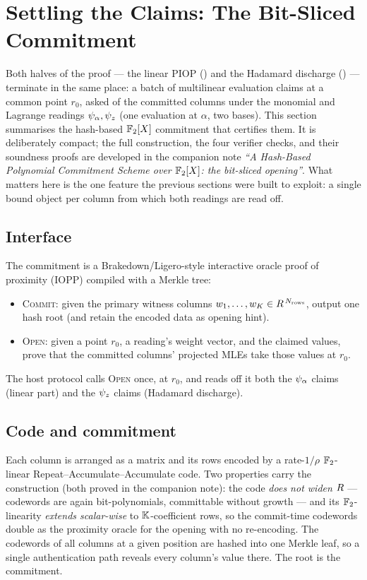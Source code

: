 \section{Settling the Claims: The Bit-Sliced Commitment}
\label{sec:commitment}

Both halves of the proof --- the linear PIOP () and the Hadamard
discharge () --- terminate in the same place: a batch of
multilinear evaluation claims at a common point $r_0$, asked of the committed
columns under the monomial and Lagrange readings $\psi_{\alpha},\psi_{z}$ (one evaluation
at $\alpha$, two bases). This section summarises the hash-based $\mathbb{F}_2[X]$
commitment that certifies them. It is deliberately compact; the full
construction, the four verifier checks, and their soundness proofs are developed
in the companion note \emph{``A Hash-Based Polynomial Commitment Scheme over
$\mathbb{F}_2[X]$: the bit-sliced opening''}. What matters here is the one feature the
previous sections were built to exploit: a single bound object per column from
which both readings are read off.

\subsection{Interface}
\label{sec:pcs-interface}

The commitment is a Brakedown/Ligero-style interactive oracle proof of proximity
(IOPP) compiled with a Merkle tree:
\begin{itemize}[leftmargin=2em]
  \item \textsc{Commit}: given the primary witness columns
    $w_1,\dots,w_K\in R^{\,N_{\mathrm{rows}}}$, output one hash root (and
    retain the encoded data as opening hint).
  \item \textsc{Open}: given a point $r_0$, a reading's weight vector, and the
    claimed values, prove that the committed columns' projected MLEs take those
    values at $r_0$.
\end{itemize}
The host protocol calls \textsc{Open} once, at $r_0$, and reads off it both the
$\psi_{\alpha}$ claims (linear part) and the $\psi_{z}$ claims (Hadamard discharge).

\subsection{Code and commitment}
\label{sec:pcs-code}

Each column is arranged as a matrix and its rows encoded by a rate-$1/\rho$
$\mathbb{F}_2$-linear Repeat--Accumulate--Accumulate code. Two properties carry the
construction (both proved in the companion note): the code \emph{does not widen}
$R$ --- codewords are again bit-polynomials, committable without
growth --- and its $\mathbb{F}_2$-linearity \emph{extends scalar-wise} to
$\mathbb{K}$-coefficient rows, so the commit-time codewords double as the proximity
oracle for the opening with no re-encoding. The codewords of all columns at a
given position are hashed into one Merkle leaf, so a single authentication path
reveals every column's value there. The root is the commitment.

